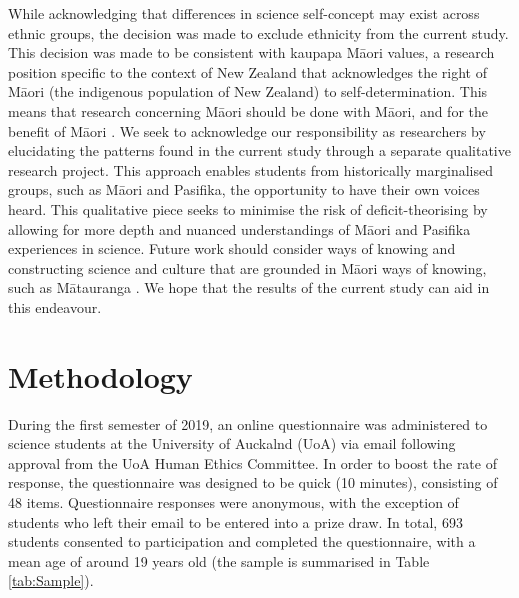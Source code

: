 While acknowledging that differences in science self-concept may exist across ethnic groups, the decision was made to exclude ethnicity from the current study. This decision was made to be consistent with kaupapa M\={a}ori values, a research position specific to the context of New Zealand that acknowledges the right of M\={a}ori (the indigenous population of New Zealand) to self-determination. This means that research concerning M\={a}ori should be done with M\={a}ori, and for the benefit of M\={a}ori \citep{walker2006exploration}. We seek to acknowledge our responsibility as researchers by elucidating the patterns found in the current study through a separate qualitative research project. This approach enables students from historically marginalised groups, such as M\={a}ori and Pasifika, the opportunity to have their own voices heard. This qualitative piece seeks to minimise the risk of deficit-theorising by allowing for more depth and nuanced understandings of M\={a}ori and Pasifika experiences in science. Future work should consider ways of knowing and constructing science and culture that are grounded in M\={a}ori ways of knowing, such as M\={a}tauranga \citep{hikuroa2017matauranga}. We hope that the results of the current study can aid in this endeavour.

\section{Methodology}
\label{method}
During the first semester of 2019, an online questionnaire was administered to science students at the University of Auckalnd (UoA) via email following approval from the UoA Human Ethics Committee. In order to boost the rate of response, the questionnaire was designed to be quick (10 minutes), consisting of 48 items. Questionnaire responses were anonymous, with the exception of students who left their email to be entered into a prize draw. In total, 693 students consented to participation and completed the questionnaire, with a mean age of around 19 years old (the sample is summarised in Table \ref{tab:Sample}). 

